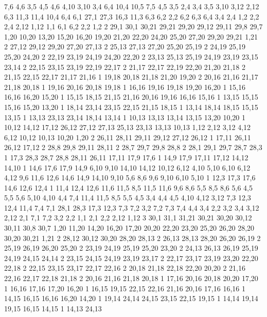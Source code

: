 7,6
4,6
%
3,5
4,5
4,6
4,10
3,10
%
3,4
6,4
10,4
10,5
7,5
4,5
3,5
%
2,4
3,4
3,5
3,10
3,12
2,12
%
6,3
11,3
11,4
10,4
6,4
%
6,1
27,1
27,3
16,3
11,3
6,3
6,2
%
2,2
6,2
6,3
6,4
3,4
2,4
%
1,2
2,2
2,4
2,12
1,12
%
1,1
6,1
6,2
2,2
1,2
2%
29,1
30,1
30,21
29,21
29,20
29,12
29,11
29,8
29,7
%
1,20
10,20
13,20
15,20
16,20
19,20
21,20
22,20
24,20
25,20
27,20
29,20
29,21
1,21
2%
27,12
29,12
29,20
27,20
27,13
2%
25,13
27,13
27,20
25,20
25,19
2%
24,19
25,19
25,20
24,20
2%
22,19
23,19
24,19
24,20
22,20
2%
23,13
25,13
25,19
24,19
23,19
23,15
23,14
2%
22,15
23,15
23,19
22,19
22,17
2%
21,17
22,17
22,19
22,20
21,20
21,18
2%
21,15
22,15
22,17
21,17
21,16
1%
19,18
20,18
21,18
21,20
19,20
2%
20,16
21,16
21,17
21,18
20,18
1%
19,16
20,16
20,18
19,18
1%
16,16
19,16
19,18
19,20
16,20
1%
15,16
16,16
16,20
15,20
1%
15,15
18,15
21,15
21,16
20,16
19,16
16,16
15,16
1%
13,15
15,15
15,16
15,20
13,20
1%
18,14
23,14
23,15
22,15
21,15
18,15
1%
13,14
18,14
18,15
15,15
13,15
1%
13,13
23,13
23,14
18,14
13,14
1%
10,13
13,13
13,14
13,15
13,20
10,20
1%
10,12
14,12
17,12
26,12
27,12
27,13
25,13
23,13
13,13
10,13
%
1,12
2,12
3,12
4,12
6,12
10,12
10,13
10,20
1,20
2%
26,11
28,11
29,11
29,12
27,12
26,12
1%
17,11
26,11
26,12
17,12
2%
28,8
29,8
29,11
28,11
2%
28,7
29,7
29,8
28,8
2%
28,1
29,1
29,7
28,7
28,3
1%
17,3
28,3
28,7
28,8
28,11
26,11
17,11
17,9
17,6
1%
14,9
17,9
17,11
17,12
14,12
14,10
1%
14,6
17,6
17,9
14,9
%
6,10
9,10
14,10
14,12
10,12
6,12
%
4,10
5,10
6,10
6,12
4,12
%
9,6
11,6
12,6
14,6
14,9
14,10
9,10
%
5,6
8,6
9,6
9,10
6,10
5,10
1%
12,3
17,3
17,6
14,6
12,6
12,4
1%
11,4
12,4
12,6
11,6
11,5
%
8,5
11,5
11,6
9,6
8,6
%
5,5
8,5
8,6
5,6
%
4,5
5,5
5,6
5,10
4,10
%
4,4
7,4
11,4
11,5
8,5
5,5
4,5
%
3,4
4,4
4,5
4,10
4,12
3,12
%
7,3
12,3
12,4
11,4
7,4
%
7,1
28,1
28,3
17,3
12,3
7,3
7,2
%
3,2
7,2
7,3
7,4
4,4
3,4
%
2,2
3,2
3,4
3,12
2,12
%
2,1
7,1
7,2
3,2
2,2
%
1,1
2,1
2,2
2,12
1,12
3%
30,1
31,1
31,21
30,21
30,20
30,12
30,11
30,8
30,7
%
1,20
11,20
14,20
16,20
17,20
20,20
22,20
23,20
25,20
26,20
28,20
30,20
30,21
1,21
2%
28,12
30,12
30,20
28,20
28,13
2%
26,13
28,13
28,20
26,20
26,19
2%
25,19
26,19
26,20
25,20
2%
23,19
24,19
25,19
25,20
23,20
2%
24,13
26,13
26,19
25,19
24,19
24,15
24,14
2%
23,15
24,15
24,19
23,19
23,17
2%
22,17
23,17
23,19
23,20
22,20
22,18
2%
22,15
23,15
23,17
22,17
22,16
2%
20,18
21,18
22,18
22,20
20,20
2%
21,16
22,16
22,17
22,18
21,18
2%
20,16
21,16
21,18
20,18
1%
17,16
20,16
20,18
20,20
17,20
1%
16,16
17,16
17,20
16,20
1%
16,15
19,15
22,15
22,16
21,16
20,16
17,16
16,16
1%
14,15
16,15
16,16
16,20
14,20
1%
19,14
24,14
24,15
23,15
22,15
19,15
1%
14,14
19,14
19,15
16,15
14,15
1%
14,13
24,13
